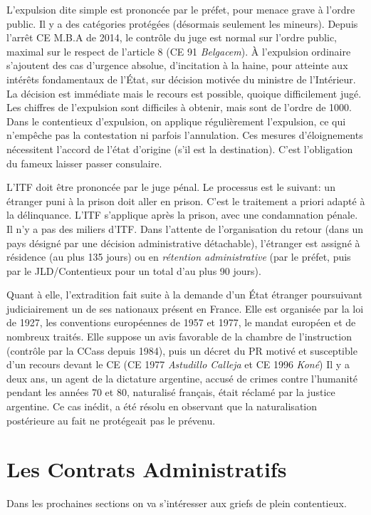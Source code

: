 \documentclass[math]{cours}
\begin{document}
L'expulsion dite simple est prononcée par le préfet, pour menace grave à l'ordre public.
Il y a des catégories protégées (désormais seulement les mineurs).
Depuis l'arrêt CE M.B.A de 2014, le contrôle du juge est normal sur l'ordre public, maximal sur le respect de l'article 8 (CE 91 \emph{Belgacem}).
À l'expulsion ordinaire s'ajoutent des cas d'urgence absolue, d'incitation à la haine, pour atteinte aux intérêts fondamentaux de l'État, sur décision motivée du ministre de l'Intérieur.
La décision est immédiate mais le recours est possible, quoique difficilement jugé.
Les chiffres de l'expulsion sont difficiles à obtenir, mais sont de l'ordre de 1000.
Dans le contentieux d'expulsion, on applique régulièrement l'expulsion, ce qui n'empêche pas la contestation ni parfois l'annulation.
Ces mesures d'éloignements nécessitent l'accord de l'état d'origine (s'il est la destination).
C'est l'obligation du fameux laisser passer consulaire.

L'ITF doit être prononcée par le juge pénal. Le processus est le suivant: un étranger puni à la prison doit aller en prison. C'est le traitement a priori adapté à la délinquance.
L'ITF s'applique après la prison, avec une condamnation pénale. Il n'y a pas des miliers d'ITF.
Dans l'attente de l'organisation du retour (dans un pays désigné par une décision administrative détachable), l'étranger est assigné à résidence (au plus 135 jours) ou en \emph{rétention administrative} (par le préfet, puis par le JLD/Contentieux pour un total d'au plus 90 jours).

Quant à elle, l'extradition fait suite à la demande d'un État étranger poursuivant judiciairement un de ses nationaux présent en France.
Elle est organisée par la loi de 1927, les conventions européennes de 1957 et 1977, le mandat européen et de nombreux traités.
Elle suppose un avis favorable de la chambre de l'instruction (contrôle par la CCass depuis 1984), puis un décret du PR motivé et susceptible d'un recours devant le CE (CE 1977 \emph{Astudillo Calleja} et CE 1996 \emph{Koné})
Il y a deux ans, un agent de la dictature argentine, accusé de crimes contre l'humanité pendant les années 70 et 80, naturalisé français, était réclamé par la justice argentine.
Ce cas inédit, a été résolu en observant que la naturalisation postérieure au fait ne protégeait pas le prévenu.





\section{Les Contrats Administratifs}
Dans les prochaines sections on va s'intéresser aux griefs de plein contentieux.
\end{document}
